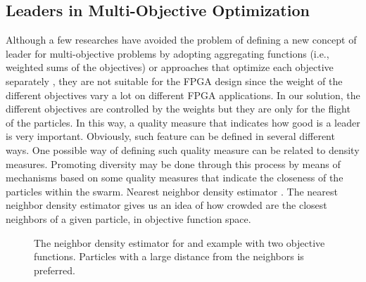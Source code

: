 \documentclass[12pt, runningheads,a4paper]{llncs}
\begin{document}
\subsection{Leaders in Multi-Objective Optimization}
Although a few researches have avoided the problem of defining a new concept of leader for multi-objective problems by adopting aggregating functions (i.e., weighted sums of the objectives) or approaches that optimize each objective separately \cite{mosurvey}, they are not suitable for the FPGA design since the weight of the different objectives vary a lot on different FPGA applications.
In our solution, the different objectives are controlled by the weights but they are only for the flight of the particles. In this way, a quality measure that indicates how good is a leader is very important. Obviously, such feature can be defined in several different ways. One possible way of defining such quality measure can be related to density measures. Promoting diversity may be done through this process by means of mechanisms based on some quality measures that indicate the closeness of the particles within the swarm.
Nearest neighbor density estimator \cite{nsga2002}. The nearest neighbor density estimator gives us an idea of how crowded are the closest neighbors of a given particle, in objective function space.
\begin{figure}
\centering
{}
\caption{The neighbor density estimator for and example with two objective functions. Particles with a large distance from the neighbors is preferred.}
\end{figure}
\end{document}
